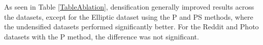 \documentclass{article}
\theoremstyle{plain}
\theoremstyle{definition}
\theoremstyle{remark}
\begin{document}
As seen in Table \ref{TableAblation}, densification generally improved results across the datasets, except for the Elliptic dataset using the P and PS methods, where the undensified datasets performed significantly better. For the Reddit and Photo datasets with the P method, the difference was not significant.


\end{document}
